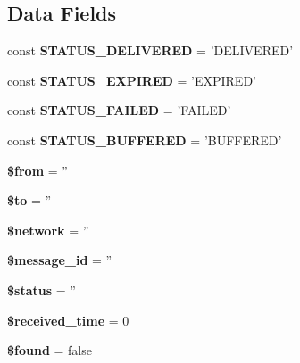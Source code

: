 \subsection*{Data Fields}
\begin{DoxyCompactItemize}
\item 
\hypertarget{class_nexmo_receipt_a0b66920133e6737fbce55a0bd2be8f28}{const {\bfseries S\-T\-A\-T\-U\-S\-\_\-\-D\-E\-L\-I\-V\-E\-R\-E\-D} = 'D\-E\-L\-I\-V\-E\-R\-E\-D'}\label{class_nexmo_receipt_a0b66920133e6737fbce55a0bd2be8f28}

\item 
\hypertarget{class_nexmo_receipt_a3a7f343577e777829255a7b206889469}{const {\bfseries S\-T\-A\-T\-U\-S\-\_\-\-E\-X\-P\-I\-R\-E\-D} = 'E\-X\-P\-I\-R\-E\-D'}\label{class_nexmo_receipt_a3a7f343577e777829255a7b206889469}

\item 
\hypertarget{class_nexmo_receipt_a8e06a807b64818e1ea719afa4b210959}{const {\bfseries S\-T\-A\-T\-U\-S\-\_\-\-F\-A\-I\-L\-E\-D} = 'F\-A\-I\-L\-E\-D'}\label{class_nexmo_receipt_a8e06a807b64818e1ea719afa4b210959}

\item 
\hypertarget{class_nexmo_receipt_a1f68cad12d8aa7dfac28a690c78db87f}{const {\bfseries S\-T\-A\-T\-U\-S\-\_\-\-B\-U\-F\-F\-E\-R\-E\-D} = 'B\-U\-F\-F\-E\-R\-E\-D'}\label{class_nexmo_receipt_a1f68cad12d8aa7dfac28a690c78db87f}

\item 
\hypertarget{class_nexmo_receipt_a0bb7e2b3d541598cc9c9e3b11bee859c}{{\bfseries \$from} = ''}\label{class_nexmo_receipt_a0bb7e2b3d541598cc9c9e3b11bee859c}

\item 
\hypertarget{class_nexmo_receipt_ac19f839b525d6d99d063fe56bf2a6d3b}{{\bfseries \$to} = ''}\label{class_nexmo_receipt_ac19f839b525d6d99d063fe56bf2a6d3b}

\item 
\hypertarget{class_nexmo_receipt_ae4ae20f4cdfc7cd4445756bf74c289dc}{{\bfseries \$network} = ''}\label{class_nexmo_receipt_ae4ae20f4cdfc7cd4445756bf74c289dc}

\item 
\hypertarget{class_nexmo_receipt_ab658319503f3b25fb0f3dadac3ce00d4}{{\bfseries \$message\-\_\-id} = ''}\label{class_nexmo_receipt_ab658319503f3b25fb0f3dadac3ce00d4}

\item 
\hypertarget{class_nexmo_receipt_a58391ea75f2d29d5d708d7050b641c33}{{\bfseries \$status} = ''}\label{class_nexmo_receipt_a58391ea75f2d29d5d708d7050b641c33}

\item 
\hypertarget{class_nexmo_receipt_a07e5808a847e09aacb911a30e58292aa}{{\bfseries \$received\-\_\-time} = 0}\label{class_nexmo_receipt_a07e5808a847e09aacb911a30e58292aa}

\item 
\hypertarget{class_nexmo_receipt_a19655ecca257a134034e17d5bedc0f75}{{\bfseries \$found} = false}\label{class_nexmo_receipt_a19655ecca257a134034e17d5bedc0f75}

\end{DoxyCompactItemize}


